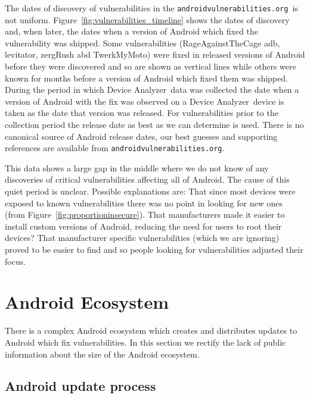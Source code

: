 \documentclass[conference,a4paper,twoside]{IEEEtran}
\newcommand{\da}{Device Analyzer}
\newcommand{\avo}{\texttt{androidvulnerabilities.org}}
\begin{document}
The dates of discovery of vulnerabilities in the \avo\ is not uniform.
Figure~\ref{fig:vulnerabilities_timeline} shows the dates of discovery and, when later, the dates when a version of Android which fixed the vulnerability was shipped.
Some vulnerabilities (RageAgainstTheCage adb, levitator, zergRush abd TwerkMyMoto) were fixed in released versions of Android before they were discovered and so are shown as vertical lines while others were known for months before a version of Android which fixed them was shipped.
During the period in which \da\ data was collected the date when a version of Android with the fix was observed on a \da\ device is taken as the date that version was released.
For vulnerabilities prior to the collection period the release date as best as we can determine is used.
There is no canonical source of Android release dates, our best guesses and supporting references are available from \avo.

This data shows a large gap in the middle where we do not know of any discoveries of critical vulnerabilities affecting all of Android.
The cause of this quiet period is unclear.
Possible explanations are: That since most devices were exposed to known vulnerabilities there was no point in looking for new ones (from Figure~\ref{fig:proportioninsecure}).
That manufacturers made it easier to install custom versions of Android, reducing the need for users to root their devices?
That manufacturer specific vulnerabilities (which we are ignoring) proved to be easier to find and so people looking for vulnerabilities adjusted their focus.

\section{Android Ecosystem}
There is a complex Android ecosystem which creates and distributes updates to Android which fix vulnerabilities.
In this section we rectify the lack of public information about the size of the Android ecosystem.


\subsection{Android update process}
\end{document}
